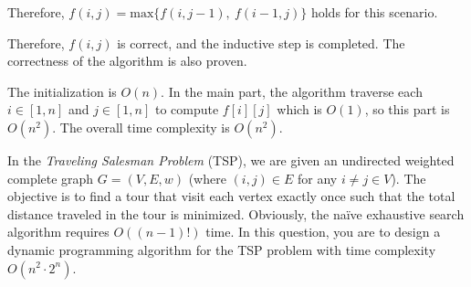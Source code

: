 \documentclass{oxmathproblems}
\begin{document}
\begin{questions}
\begin{Solution}
\begin{itemize}
    Therefore, $f(i, j)=\text{max}\{f(i, j-1),\ f(i-1, j)\}$ holds for this scenario.
\end{itemize}

Therefore, $f(i, j)$ is correct, and the inductive step is completed. The correctness of the algorithm is also proven.

The initialization is $O(n)$. In the main part, the algorithm traverse each $i\in[1,n]$ and $j\in[1,n]$ to compute $f[i][j]$ which is $O(1)$, so this part is $O(n^2)$. The overall time complexity is $O(n^2)$.



\end{Solution}

\miquestion[40]
In the \emph{Traveling Salesman Problem} (TSP), we are given an undirected weighted complete graph $G=(V,E,w)$ (where $(i,j)\in E$ for any $i\neq j\in V$). The objective is to find a tour that visit each vertex exactly once such that the total distance traveled in the tour is minimized.
Obviously, the na\"ive exhaustive search algorithm requires $O((n-1)!)$ time.
In this question, you are to design a dynamic programming algorithm for the TSP problem with time complexity $O(n^2\cdot 2^n)$.

\begin{Solution}
\end{Solution}
\end{questions}
\end{document}

